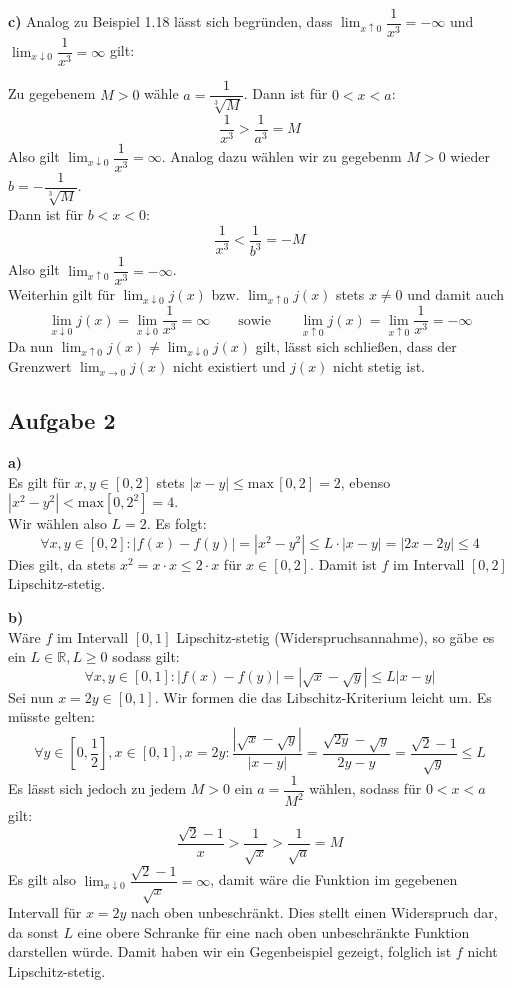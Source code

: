 \documentclass[a4paper,graphics,11pt]{article}
\newcommand{\aufgabe}[1]{\subsection*{Aufgabe #1}}
\begin{document}
\textbf{c)}
Analog zu Beispiel 1.18 lässt sich begründen, dass
$\lim_{x \uparrow 0}\limits\dfrac{1}{x^3} = -\infty$ und
$\lim_{x \downarrow 0}\limits\dfrac{1}{x^3} = \infty$ gilt:

Zu gegebenem $M > 0$ wähle $a= \dfrac{1}{\sqrt[3]{M}}$. Dann ist für $0 < x < a$:
$$
    \frac{1}{x^3} > \frac{1}{a^3} = M
$$
Also gilt $\lim_{x \downarrow 0}\limits \dfrac{1}{x^3} = \infty$. Analog dazu
wählen wir zu gegebenm $M>0$ wieder $b= -\dfrac{1}{\sqrt[3]{M}}$.\\
Dann ist für $b < x < 0$:
$$
    \frac{1}{x^3} < \frac{1}{b^3} = -M
$$
Also gilt $\lim_{x \uparrow 0}\limits \dfrac{1}{x^3} = -\infty$.\\
Weiterhin gilt für $\lim_{x \downarrow 0} j(x)$ bzw. $\lim_{x \uparrow 0} j(x)$ stets $x\neq0$ und damit auch
$$
    \lim_{x \downarrow 0} j(x) = \lim_{x \downarrow 0} \frac{1}{x^3} = \infty
    \qquad\text{sowie}\qquad
    \lim_{x \uparrow 0} j(x) = \lim_{x \uparrow 0} \frac{1}{x^3} = -\infty
$$
Da nun $\lim_{x \uparrow 0}\limits j(x) \neq \lim_{x \downarrow 0}\limits j(x)$ gilt,
lässt sich schließen, dass der Grenzwert $\lim_{x \to 0}\limits j(x)$ nicht existiert und
$j(x)$ nicht stetig ist.

\aufgabe{2}

\textbf{a)}\\
Es gilt für $x,y \in [0,2]$ stets $|x-y| \leq \text{max}\,[0,2] = 2$,
ebenso $|x^2-y^2| < \text{max} [0,2^2] = 4$.\\
Wir wählen also $L = 2$. Es folgt:
$$
    \forall x,y \in [0,2] \colon |f(x)-f(y)| = |x^2-y^2| \leq L \cdot |x-y| = |2x-2y| \leq 4
$$
Dies gilt, da stets $x^2 = x\cdot x \leq 2\cdot x$ für $x \in [0,2]$.
Damit ist $f$ im Intervall $[0,2]$ Lipschitz-stetig.


\textbf{b)}\\
Wäre $f$ im Intervall $[0,1]$ Lipschitz-stetig (Widerspruchsannahme), so gäbe es
ein $L \in \mathbb{R}, L \geq 0$ sodass gilt:
$$
    \forall x,y \in [0,1] \colon |f(x)-f(y)| = |\sqrt{x} -\sqrt{y} | \leq L |x-y|
$$
Sei nun $x = 2y \in [0,1]$. Wir formen die das Libschitz-Kriterium leicht um. Es müsste
gelten:
$$
    \forall y \in \left[0,\frac{1}{2}\right], x \in [0,1], x = 2y\colon
    \frac{|\sqrt{x} - \sqrt{y}|}{|x-y|}
    = \frac{\sqrt{2y} - \sqrt{y}}{2y-y}
    = \frac{\sqrt{2} - 1}{\sqrt{y}} \leq L
$$
Es lässt sich jedoch zu jedem $M > 0$ ein $a = \dfrac{1}{M^2}$ wählen, sodass für $0 < x < a$ gilt:
$$
    \frac{\sqrt{2}-1}{x} > \frac{1}{\sqrt{x}} > \frac{1}{\sqrt{a}} = M
$$
Es gilt also $\lim_{x \downarrow 0}\limits \dfrac{\sqrt{2} - 1}{\sqrt{x}} = \infty$,
damit wäre die Funktion im gegebenen Intervall für $x = 2y$ nach oben unbeschränkt.
Dies stellt einen Widerspruch dar, da sonst $L$ eine obere Schranke
für eine nach oben unbeschränkte Funktion darstellen würde. Damit haben wir ein
Gegenbeispiel gezeigt, folglich ist $f$ nicht Lipschitz-stetig.
\newpage
\end{document}
